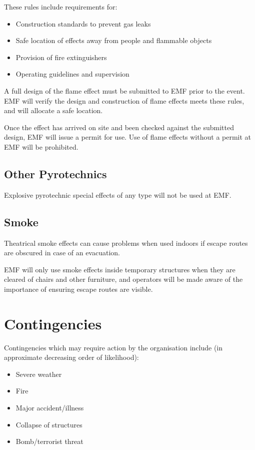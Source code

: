 These rules include requirements for:
\begin{itemize}
    \tightlist
    \item Construction standards to prevent gas leaks
    \item Safe location of effects away from people and flammable objects
    \item Provision of fire extinguishers
    \item Operating guidelines and supervision
\end{itemize}

A full design of the flame effect must be submitted to EMF prior to the
event. EMF will verify the design and construction of flame effects meets
these rules, and will allocate a safe location.

Once the effect has arrived on site and been checked against the submitted
design, EMF will issue a permit for use. Use of flame effects without a
permit at EMF will be prohibited.

\subsection{Other Pyrotechnics}
Explosive pyrotechnic special effects of any type will not be used at EMF.

\subsection{Smoke}
Theatrical smoke effects can cause problems when used indoors if escape
routes are obscured in case of an evacuation.

EMF will only use smoke effects inside temporary structures when they are
cleared of chairs and other furniture, and operators will be made aware of
the importance of ensuring escape routes are visible.

\newpage

\section{Contingencies}\label{contingencies}
Contingencies which may require action by the organisation include (in
approximate decreasing order of likelihood):

\begin{itemize}
\tightlist
  \item Severe weather
  \item Fire
  \item Major accident/illness
  \item Collapse of structures
  \item Bomb/terrorist threat
\end{itemize}

